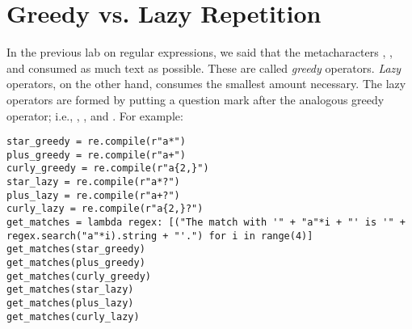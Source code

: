 


\label{lab:Regex_Advanced}

\section*{Greedy vs. Lazy Repetition}

In the previous lab on regular expressions, we said that the metacharacters , , and  consumed as much text as possible. These are called \emph{greedy} operators. \emph{Lazy} operators, on the other hand, consumes the smallest amount necessary. The lazy operators are formed by putting a question mark after the analogous greedy operator; i.e., , , and .
For example:
\begin{lstlisting}
star_greedy = re.compile(r"a*")
plus_greedy = re.compile(r"a+")
curly_greedy = re.compile(r"a{2,}")
star_lazy = re.compile(r"a*?")
plus_lazy = re.compile(r"a+?")
curly_lazy = re.compile(r"a{2,}?")
get_matches = lambda regex: [("The match with '" + "a"*i + "' is '" + regex.search("a"*i).string + "'.") for i in range(4)]
get_matches(star_greedy)
get_matches(plus_greedy)
get_matches(curly_greedy)
get_matches(star_lazy)
get_matches(plus_lazy)
get_matches(curly_lazy)
\end{lstlisting}




